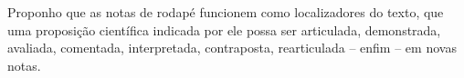Proponho que as notas de rodapé funcionem como localizadores do texto, que uma proposição científica indicada por ele possa ser articulada, demonstrada, avaliada, comentada, interpretada, contraposta, rearticulada -- enfim -- em novas notas.